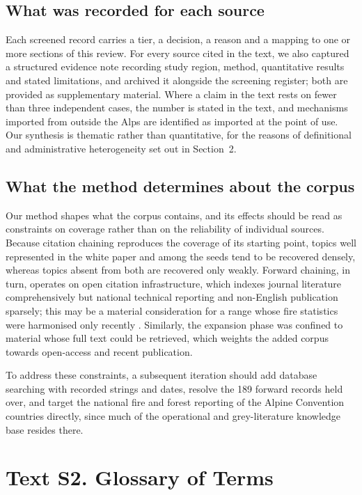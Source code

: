 \documentclass[11pt,a4paper]{article}
\begin{document}
\subsection*{What was recorded for each source}
\label{app:recorded}

Each screened record carries a tier, a decision, a reason and a mapping to one or more sections of this review. For every source cited in the text, we also captured a structured evidence note recording study region, method, quantitative results and stated limitations, and archived it alongside the screening register; both are provided as supplementary material. Where a claim in the text rests on fewer than three independent cases, the number is stated in the text, and mechanisms imported from outside the Alps are identified as imported at the point of use. Our synthesis is thematic rather than quantitative, for the reasons of definitional and administrative heterogeneity set out in Section~2.

\subsection*{What the method determines about the corpus}

Our method shapes what the corpus contains, and its effects should be read as constraints on coverage rather than on the reliability of individual sources. Because citation chaining reproduces the coverage of its starting point, topics well represented in the white paper and among the seeds tend to be recovered densely, whereas topics absent from both are recovered only weakly. Forward chaining, in turn, operates on open citation infrastructure, which indexes journal literature comprehensively but national technical reporting and non-English publication sparsely; this may be a material consideration for a range whose fire statistics were harmonised only recently \citep{valese_wildfires_2011}. Similarly, the expansion phase was confined to material whose full text could be retrieved, which weights the added corpus towards open-access and recent publication.

To address these constraints, a subsequent iteration should add database searching with recorded strings and dates, resolve the 189 forward records held over, and target the national fire and forest reporting of the Alpine Convention countries directly, since much of the operational and grey-literature knowledge base resides there.

\section*{Text S2. Glossary of Terms}
\end{document}
